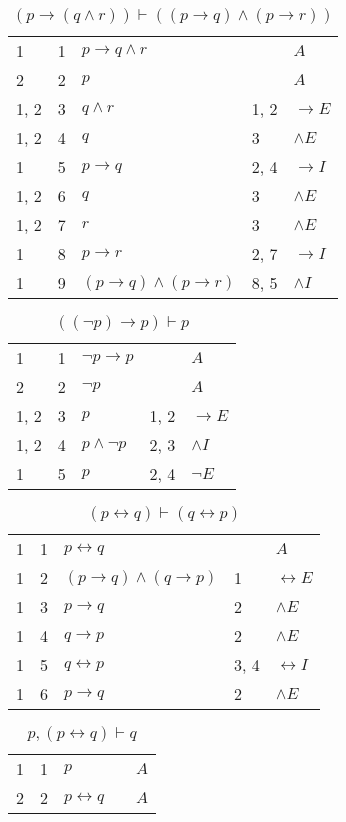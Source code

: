 \documentclass{article}
\begin{document}
\begin{table}[htbp]
\end{table}\begin{table}[htbp]\caption*{$(p→(q∧r)) ⊢ ((p→q)∧(p→r))$}\centering\begin{tabular}{lrlll}
{1} & 1 & $p→q∧r$ & {} & $A$ \\
{2} & 2 & $p$ & {} & $A$ \\
{1, 2} & 3 & $q∧r$ & {1, 2} & $→E$ \\
{1, 2} & 4 & $q$ & {3} & $∧E$ \\
{1} & 5 & $p→q$ & {2, 4} & $→I$ \\
{1, 2} & 6 & $q$ & {3} & $∧E$ \\
{1, 2} & 7 & $r$ & {3} & $∧E$ \\
{1} & 8 & $p→r$ & {2, 7} & $→I$ \\
{1} & 9 & $(p→q)∧(p→r)$ & {8, 5} & $∧I$ \\
\end{tabular}
\end{table}\begin{table}[htbp]\caption*{$((¬p)→p) ⊢ p$}\centering\begin{tabular}{lrlll}
{1} & 1 & $¬p→p$ & {} & $A$ \\
{2} & 2 & $¬p$ & {} & $A$ \\
{1, 2} & 3 & $p$ & {1, 2} & $→E$ \\
{1, 2} & 4 & $p∧ ¬p$ & {2, 3} & $∧I$ \\
{1} & 5 & $p$ & {2, 4} & $¬E$ \\
\end{tabular}
\end{table}\begin{table}[htbp]\caption*{$(p↔q) ⊢ (q↔p)$}\centering\begin{tabular}{lrlll}
{1} & 1 & $p↔q$ & {} & $A$ \\
{1} & 2 & $(p→q)∧(q→p)$ & {1} & $↔E$ \\
{1} & 3 & $p→q$ & {2} & $∧E$ \\
{1} & 4 & $q→p$ & {2} & $∧E$ \\
{1} & 5 & $q↔p$ & {3, 4} & $↔I$ \\
{1} & 6 & $p→q$ & {2} & $∧E$ \\
\end{tabular}
\end{table}\begin{table}[htbp]\caption*{$p,(p↔q) ⊢ q$}\centering\begin{tabular}{lrlll}
{1} & 1 & $p$ & {} & $A$ \\
{2} & 2 & $p↔q$ & {} & $A$ \\

\end{tabular}
\end{table}
\end{document}
